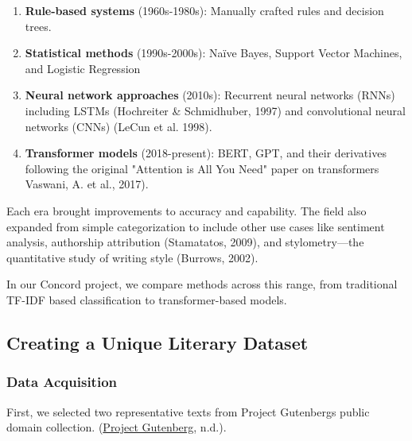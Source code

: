 \documentclass[
]{article}
\begin{document}
\begin{enumerate}
\def\labelenumi{\arabic{enumi}.}
\item
  \textbf{Rule-based systems} (1960s-1980s): Manually crafted rules and
  decision trees.
\item
  \textbf{Statistical methods} (1990s-2000s): Naïve Bayes, Support
  Vector Machines, and Logistic Regression
\item
  \textbf{Neural network approaches} (2010s): Recurrent neural networks
  (RNNs) including LSTMs (Hochreiter \& Schmidhuber, 1997) and
  convolutional neural networks (CNNs) (LeCun et al. 1998).
\item
  \textbf{Transformer models} (2018-present): BERT, GPT, and their
  derivatives following the original "Attention is All You Need" paper
  on transformers Vaswani, A. et al., 2017).
\end{enumerate}

Each era brought improvements to accuracy and capability. The field also
expanded from simple categorization to include other use cases like
sentiment analysis, authorship attribution (Stamatatos, 2009), and
stylometry---the quantitative study of writing style (Burrows, 2002).

In our Concord project, we compare methods across this range, from
traditional TF-IDF based classification to transformer-based models.

\subsection{Creating a Unique Literary
Dataset}\label{creating-a-unique-literary-dataset}

\subsubsection{Data Acquisition}\label{data-acquisition}

First, we selected two representative texts from Project
Gutenberg\textquotesingle s public domain collection.
(\href{https://www.gutenberg.org/}{Project Gutenberg}, n.d.).
\end{document}
